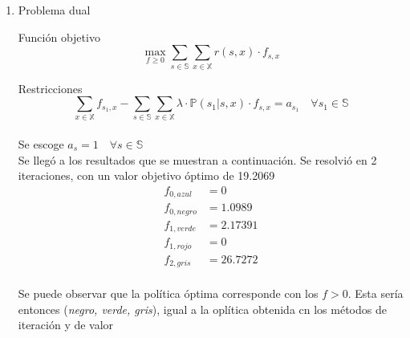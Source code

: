 \documentclass[letterpaper,10pt]{article}
\begin{document}
\begin{enumerate}
\begin{enumerate}
        \item 
        
        
        Problema dual
        
        Función objetivo
        $$\max_{f \geq 0} \sum\limits_{s \in \mathds{S}}\sum\limits_{x \in \mathds{X}} r(s,x) \cdot f_{s,x} $$
        
        Restricciones
        $$\sum\limits_{x \in \mathds{X}} f_{s_1,x} - \sum\limits_{s \in \mathds{S}}\sum\limits_{x \in \mathds{X}} \lambda \cdot \mathds{P}(s_1 | s,x) \cdot f_{s,x} = a_{s_1} \quad \forall s_1 \in \mathds{S}$$ \\
        
        Se escoge $a_s = 1 \quad \forall s \in \mathds{S}$ \\
        
        Se llegó a los resultados que se muestran a continuación. Se resolvió en 2 iteraciones, con un valor objetivo óptimo de 19.2069
        \begin{align*}
            f_{0,azul} &= 0 \\
            f_{0,negro} &= 1.0989 \\
            f_{1,verde} &= 2.17391 \\
            f_{1,rojo} &= 0 \\
            f_{2,gris} &= 26.7272 \\
        \end{align*}
        
        Se puede observar que la política óptima corresponde con los $f > 0$. Esta sería entonces (\textit{negro, verde, gris}), igual a la oplítica obtenida cn los métodos de iteración y de valor
      
        
        
    \end{enumerate}
\end{enumerate}

\section{}
\end{document}
